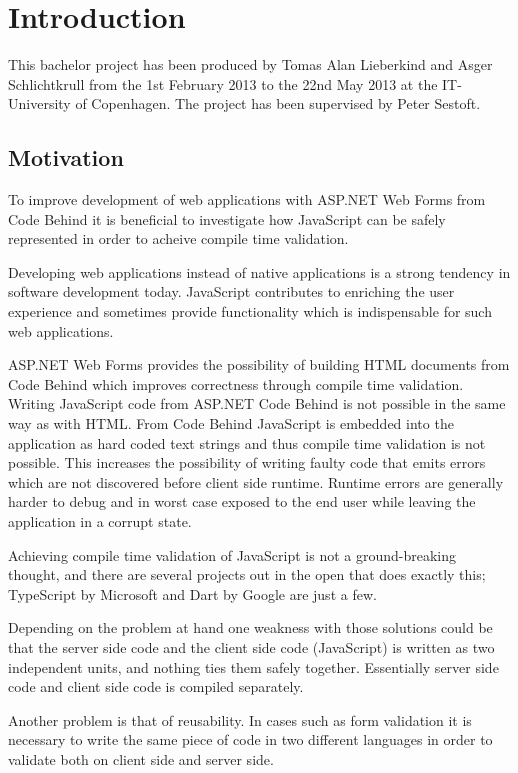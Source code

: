 \chapter{Introduction}
	This bachelor project has been produced by Tomas Alan Lieberkind and Asger Schlichtkrull from the 1st February 2013 to the 22nd May 2013 at the IT-University of Copenhagen. The project has been supervised by Peter Sestoft.

\section{Motivation}
	To improve development of web applications with ASP.NET Web Forms from Code Behind it is beneficial to investigate how JavaScript can be safely represented in order to acheive compile time validation.

	Developing web applications instead of native applications is a strong tendency in software development today. JavaScript contributes to enriching the user experience and sometimes provide functionality which is indispensable for such web applications.

	ASP.NET Web Forms provides the possibility of building HTML documents from Code Behind which improves correctness through compile time validation. Writing JavaScript code from ASP.NET Code Behind is not possible in the same way as with HTML. From Code Behind JavaScript is embedded into the application as hard coded text strings and thus compile time validation is not possible. This increases the possibility of writing faulty code that emits errors which are not discovered before client side runtime. Runtime errors are generally harder to debug and in worst case exposed to the end user while leaving the application in a corrupt state.

	Achieving compile time validation of JavaScript is not a ground-breaking thought, and there are several projects out in the open that does exactly this; TypeScript by Microsoft and Dart by Google are just a few.

	Depending on the problem at hand one weakness with those solutions could be that the server side code and the client side code (JavaScript) is written as two independent units, and nothing ties them safely together. Essentially server side code and client side code is compiled separately. 

	Another problem is that of reusability. In cases such as form validation it is necessary to write the same piece of code in two different languages in order to validate both on client side and server side.

